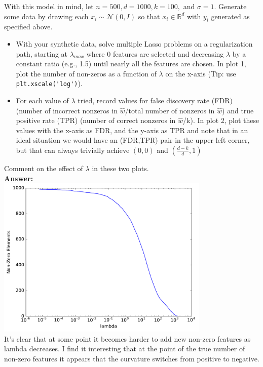 \documentclass{article}
\newcommand{\field}[1]{\mathbb{#1}}
\newcommand{\1}{\mathbf{1}}
\newcommand{\R}{\field{R}} %
\begin{document}
With this model in mind, let $n = 500, d = 1000, k = 100,$ and $\sigma = 1$.  Generate some data by drawing each $x_i \sim \mathcal{N}(0, I)$ so that $x_i \in \R^d$ with $y_i$ generated as specified above.
  \begin{itemize}
    \item  With your synthetic data, solve multiple Lasso problems on a regularization path, starting at $\lambda_{max}$ where $0$ features are selected and
  decreasing $\lambda$ by a constant ratio (e.g., 1.5) until nearly all the features are chosen.  
  In plot 1, plot the number of non-zeros as a function of $\lambda$ on the x-axis (Tip: use \verb|plt.xscale('log')|).
  \item  For each value of $\lambda$ tried, record values for false discovery rate (FDR) (number of incorrect nonzeros in $\widehat{w}$/total number of nonzeros in $\widehat{w}$) and true positive rate (TPR)
  (number of correct nonzeros in $\widehat{w}$/k).
  In plot 2, plot these values with the x-axis as FDR, and the y-axis as TPR and note that in an ideal situation we would have an (FDR,TPR) pair in the upper left corner, but that can always trivially achieve $(0,0)$ and $(\tfrac{d-k}{d},1)$ 
\end{itemize}      
  Comment on the effect of $\lambda$ in these two plots.\\
  
  \textbf{Answer:}\\
  
\includegraphics[width=4in]{NonzerovsLambda.pdf}\\
It's clear that at some point it becomes harder to add new non-zero features as lambda decreases. I find it interesting that at the point of the true number of non-zero features it appears that the curvature switches from positive to negative.
\end{document}
